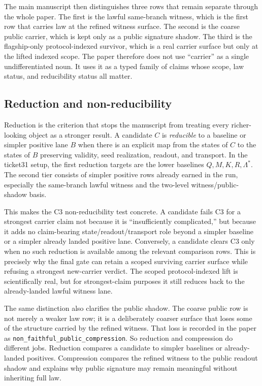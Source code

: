 \documentclass[11pt]{article}
\theoremstyle{definition}
\begin{document}
The main manuscript then distinguishes three rows that remain separate through the whole
paper. The first is the lawful same-branch witness, which is the first row that carries
law at the refined witness surface. The second is the coarse public carrier, which is kept
only as a public signature shadow. The third is the flagship-only protocol-indexed
survivor, which is a real carrier surface but only at the lifted indexed scope. The paper
therefore does not use ``carrier'' as a single undifferentiated noun. It uses it as a
typed family of claims whose scope, law status, and reducibility status all matter.

\subsection{Reduction and non-reducibility}

Reduction is the criterion that stops the manuscript from treating every richer-looking
object as a stronger result. A candidate \(C\) is \emph{reducible} to a baseline or
simpler positive lane \(B\) when there is an explicit map from the states of \(C\) to the
states of \(B\) preserving validity, seed realization, readout, and transport. In the
ticket31 setup, the first reduction targets are the lower baselines
\(Q, M, K, R,\Lambda^\ast\). The second tier consists of simpler positive rows already
earned in the run, especially the same-branch lawful witness and the two-level
witness/public-shadow basis.

This makes the C3 non-reducibility test concrete. A candidate fails C3 for a strongest
carrier claim not because it is ``insufficiently complicated,'' but because it adds no
claim-bearing state/readout/transport role beyond a simpler baseline or a simpler already
landed positive lane. Conversely, a candidate clears C3 only when no such reduction is
available among the relevant comparison rows. This is precisely why the final gate can
retain a scoped surviving carrier surface while refusing a strongest new-carrier verdict.
The scoped protocol-indexed lift is scientifically real, but for strongest-claim purposes
it still reduces back to the already-landed lawful witness lane.

The same distinction also clarifies the public shadow. The coarse public row is not merely
a weaker law row; it is a deliberately coarser surface that loses some of the structure
carried by the refined witness. That loss is recorded in the paper as
\texttt{non\_faithful\_public\_compression}. So reduction and compression do different
jobs. Reduction compares a candidate to simpler baselines or already-landed positives.
Compression compares the refined witness to the public readout shadow and explains why
public signature may remain meaningful without inheriting full law.
\end{document}
